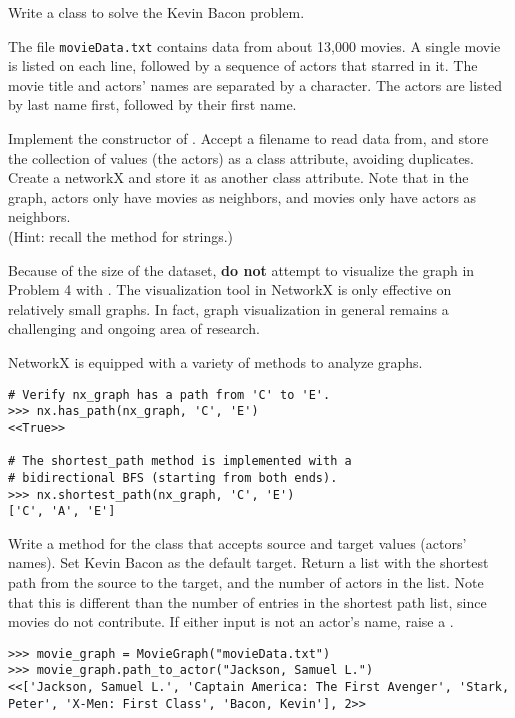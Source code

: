 \begin{problem} %
Write a  class to solve the Kevin Bacon problem.

The file \texttt{movieData.txt} contains data from about 13,000 movies.
A single movie is listed on each line, followed by a sequence of actors that starred in it.
The movie title and actors' names are separated by a \li{/} character.
The actors are listed by last name first, followed by their first name.

Implement the constructor of .
Accept a filename to read data from, and store the collection of values (the actors) as a class attribute, avoiding duplicates.
Create a networkX  and store it as another class attribute.
Note that in the graph, actors only have movies as neighbors, and movies only have actors as neighbors.
\\(Hint: recall the  method for strings.)

\end{problem}

\begin{warn}
Because of the size of the dataset, \textbf{do not} attempt to visualize the graph in Problem 4 with .
The visualization tool in NetworkX is only effective on relatively small graphs.
In fact, graph visualization in general remains a challenging and ongoing area of research.
\end{warn}

NetworkX is equipped with a variety of methods to analyze graphs.

\begin{lstlisting}
# Verify nx_graph has a path from 'C' to 'E'.
>>> nx.has_path(nx_graph, 'C', 'E')
<<True>>

# The shortest_path method is implemented with a
# bidirectional BFS (starting from both ends).
>>> nx.shortest_path(nx_graph, 'C', 'E')
['C', 'A', 'E']
\end{lstlisting}

\begin{problem}
Write a method for the  class that accepts source and target values (actors' names).
Set Kevin Bacon as the default target.
Return a list with the shortest path from the source to the target, and the number of actors in the list.
Note that this is different than the number of entries in the shortest path list, since movies do not contribute.
If either input is not an actor's name, raise a .
\begin{lstlisting}
>>> movie_graph = MovieGraph("movieData.txt")
>>> movie_graph.path_to_actor("Jackson, Samuel L.")
<<['Jackson, Samuel L.', 'Captain America: The First Avenger', 'Stark,
Peter', 'X-Men: First Class', 'Bacon, Kevin'], 2>>
\end{lstlisting}
\label{prob:actor_path}
\end{problem}


